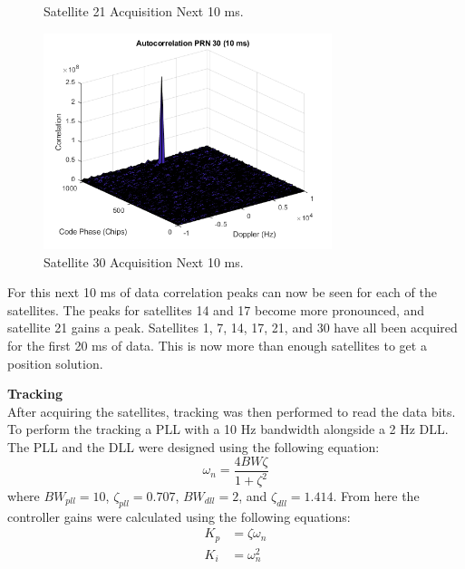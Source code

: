 \documentclass[11pt]{article}
\begin{document}
\begin{enumerate}[label=\textbf{\arabic*.}]
\begin{figure}[H]
        \caption{Satellite 21 Acquisition Next 10 ms.}
    \end{figure}
    \begin{figure}[H]
        \centering
        \includegraphics[width=0.75\textwidth]{Lab_4_PRN30_10ms.png}
        \caption{Satellite 30 Acquisition Next 10 ms.}
    \end{figure}
For this next 10 ms of data correlation peaks can now be seen for each of the satellites. The peaks for satellites 14 and 17 become more pronounced, and satellite 21 gains a peak. Satellites 1, 7, 14, 17, 21, and 30 have all been acquired for the first 20 ms of data. This is now more than enough satellites to get a position solution.
\end{enumerate}

\item \textbf{Tracking}\\
After acquiring the satellites, tracking was then performed to read the data bits. To perform the
tracking a PLL with a 10 Hz bandwidth alongside a 2 Hz DLL. The PLL and the DLL were designed using 
the following equation:
    \begin{equation}
        \omega_n = \dfrac{4BW\zeta}{1+\zeta^2}
    \end{equation}
where $BW_{pll} = 10$, $\zeta_{pll} = 0.707$, $BW_{dll} = 2$, and $\zeta_{dll} = 1.414$. 
From here the controller gains were calculated using the following equations:
    \begin{equation}
        \begin{split}
            K_p &= \zeta \omega_n \\
            K_i &= \omega_n^2
        \end{split}
    \end{equation}
\end{document}
